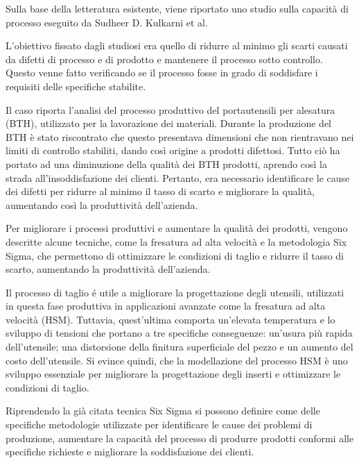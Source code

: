 Sulla base della letteratura esistente, viene riportato
uno studio sulla capacità di processo eseguito da Sudheer D. Kulkarni et al. 
\cite{DUDEKBURLIKOWSKA2005736}

 L'obiettivo fissato dagli studiosi era quello di ridurre al minimo gli scarti causati da difetti di processo e di prodotto e mantenere il processo sotto controllo.
 Questo venne fatto verificando se il processo fosse in grado di soddisfare i requisiti delle specifiche stabilite.

Il caso riporta l'analisi del processo produttivo del portautensili per alesatura (BTH), utilizzato per la lavorazione dei materiali.
Durante la produzione del BTH è stato riscontrato che questo presentava dimensioni che non rientravano nei limiti di controllo stabiliti, dando così origine a prodotti difettosi. 
Tutto ciò ha portato ad una diminuzione della qualità dei BTH prodotti, aprendo così la strada all'insoddisfazione dei clienti.
 Pertanto, era necessario identificare le cause dei difetti per ridurre al minimo il tasso di scarto e migliorare la qualità, aumentando così la produttività dell'azienda.

Per migliorare i processi produttivi e aumentare la qualità dei prodotti, vengono descritte alcune tecniche, come la fresatura ad alta velocità e la metodologia Six Sigma, che permettono di ottimizzare le condizioni di taglio e ridurre il tasso di scarto, aumentando la produttività dell'azienda.

Il processo di taglio é utile a migliorare la progettazione degli utensili, utilizzati in questa fase produttiva in applicazioni avanzate come la fresatura ad alta velocità (HSM). 
Tuttavia, quest'ultima comporta un'elevata temperatura e lo sviluppo di tensioni che portano a tre specifiche conseguenze: un'usura più rapida dell'utensile; una distorsione della finitura superficiale del pezzo e un aumento del costo dell'utensile. 
Si evince quindi, che la modellazione del processo HSM è uno sviluppo essenziale per migliorare la progettazione degli inserti e ottimizzare le condizioni di taglio.

Riprendendo la già citata tecnica Six Sigma si possono definire come delle specifiche metodologie utilizzate per identificare le cause dei problemi di produzione, aumentare la capacità del processo di produrre prodotti conformi alle specifiche richieste e migliorare la soddisfazione dei clienti.

